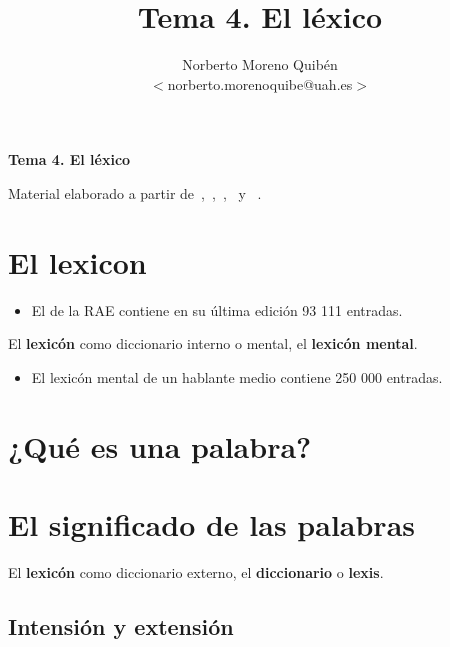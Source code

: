 \documentclass[12pt]{article}
\title{Tema 4. El léxico}
\author{Norberto Moreno Quibén\\
        \small $<$norberto.morenoquibe@uah.es$>$}
\date{}
\begin{document}
\textbf{\Large Tema 4. El léxico}

\tableofcontents

Material elaborado a partir de~\textcite{bosque1982sobre-la-teoria,bosque2004combinatoria-y-signi},~\textcite{murphy2010lexicalmeaning},~\textcite{jezek2015the-lexicon-an},~\textcite{pustejovsky2019the-lexicon} y ~\textcite[caps. «Lexicología» y «Diccionarios»][]{2016enciclopedia-de-linguistica}.

%
%
\printbibliography

\section{El lexicon}
\begin{itemize}
  \item El \href{https://dle.rae.es/?w=diccionario}{} de la RAE contiene en su última edición 93 111 entradas.
\end{itemize}


El \textbf{lexicón} como diccionario interno o mental, el \textbf{lexicón mental}.
\begin{itemize}
  \item El lexicón mental de un hablante medio contiene 250 000 entradas.
\end{itemize}



\section{¿Qué es una palabra?}
\section{El significado de las palabras}

El \textbf{lexicón} como diccionario externo, el \textbf{diccionario} o \textbf{lexis}.

\subsection{Intensión y extensión}
\end{document}
